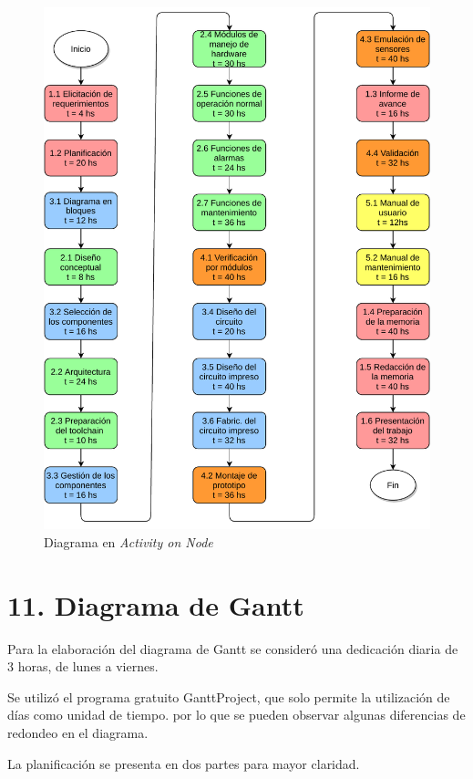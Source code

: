 \documentclass[
11pt, %
codirector, %
]{charter}
\begin{document}
\begin{figure}[htpb]
\centering 
\includegraphics[width=.8\textwidth]{./Figuras/SMTB_AoN.pdf}
\caption{Diagrama en \textit{Activity on Node}}
\label{fig:AoN}
\end{figure}


\section{11. Diagrama de Gantt}
\label{sec:gantt}

Para la elaboración del diagrama de Gantt se consideró una dedicación diaria de 3 horas, de lunes a viernes.

Se utilizó el programa gratuito GanttProject, que solo permite la utilización de días como unidad de tiempo. por lo que se pueden observar algunas diferencias de redondeo en el diagrama.

La planificación se presenta en dos partes para mayor claridad.
\end{document}
